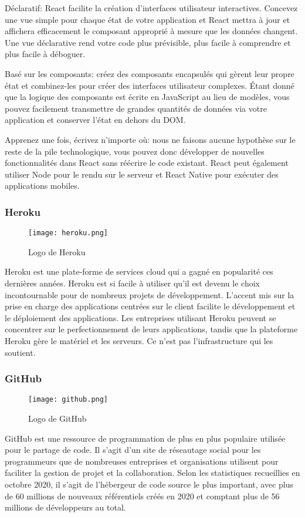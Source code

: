 \begin{enumerate}
        Déclaratif: React facilite la création d'interfaces utilisateur interactives. Concevez une vue simple pour chaque état de votre application et React mettra à jour et affichera efficacement le composant approprié à mesure que les  données changent. Une vue déclarative rend votre code plus prévisible, plus facile à comprendre et plus facile à déboguer. 
 
        Basé sur les composants: créez des composants encapsulés qui gèrent leur propre état et combinez-les pour créer des interfaces utilisateur complexes. Étant donné que la logique des composants est écrite en JavaScript au lieu de modèles, vous pouvez facilement transmettre de grandes quantités de données  via votre application et conserver l'état en dehors du DOM.
 
        Apprenez une fois, écrivez n'importe où: nous ne faisons aucune hypothèse sur le reste de la pile technologique, vous pouvez donc développer de nouvelles fonctionnalités dans React sans réécrire le code existant. React peut également utiliser Node pour le rendu sur le serveur  et React Native pour exécuter des applications mobiles.

        \bfseries
    \end{enumerate}
    \subsubsection{Heroku}
    \begin{figure}[H]
        \centering
        \texttt{[image: heroku.png]}
        \caption{Logo de Heroku}\label{fig:heroku}
    \end{figure}

    Heroku est une plate-forme de services cloud qui a gagné en popularité  ces dernières années. Heroku est si facile à utiliser qu'il est devenu le choix incontournable pour de nombreux projets de développement. 
    L'accent mis sur la prise en charge des applications centrées sur le client facilite le développement et le déploiement  des applications. Les entreprises utilisant Heroku peuvent se concentrer sur le perfectionnement de leurs applications, tandis que la plateforme Heroku gère le matériel et les serveurs. Ce n'est pas l'infrastructure qui les soutient.

    \subsubsection{GitHub}
    \begin{figure}[H]
        \centering
        \texttt{[image: github.png]}
        \caption{Logo de GitHub}\label{fig:github}
    \end{figure}
    GitHub est une ressource de programmation de plus en plus populaire utilisée pour le partage de code. Il s'agit d'un site de réseautage social pour les programmeurs que de nombreuses entreprises et organisations utilisent pour faciliter la gestion de projet et la collaboration. Selon les statistiques recueillies en octobre 2020, il s'agit de l'hébergeur de code source le plus important, avec plus de 60 millions de nouveaux référentiels créés en 2020 et comptant plus de 56 millions de développeurs au total.
